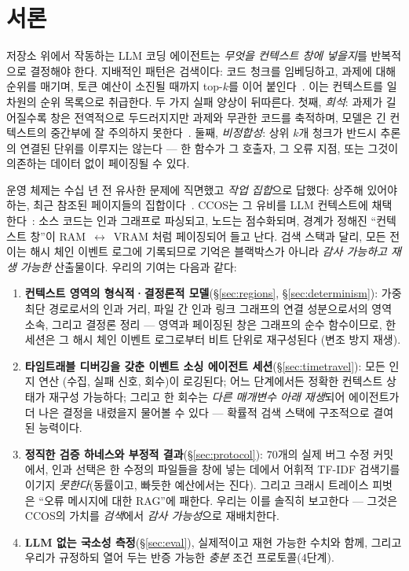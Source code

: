 \documentclass[11pt]{article}
\begin{document}
\section{서론}

저장소 위에서 작동하는 LLM 코딩 에이전트는 \emph{무엇을 컨텍스트 창에 넣을지}를 반복적으로 결정해야 한다.
지배적인 패턴은 검색이다: 코드 청크를 임베딩하고, 과제에 대해 순위를 매기며, 토큰 예산이 소진될 때까지
top-$k$를 이어 붙인다~\cite{lewis2020rag}. 이는 컨텍스트를 일차원의 순위 목록으로 취급한다. 두 가지 실패
양상이 뒤따른다. 첫째, \emph{희석}: 과제가 길어질수록 창은 전역적으로 두드러지지만 과제와 무관한 코드를
축적하며, 모델은 긴 컨텍스트의 중간부에 잘 주의하지 못한다~\cite{liu2023lost}. 둘째, \emph{비정합성}:
상위 $k$개 청크가 반드시 추론의 연결된 단위를 이루지는 않는다 --- 한 함수가 그 호출자, 그 오류 지점, 또는
그것이 의존하는 데이터 없이 페이징될 수 있다.

운영 체제는 수십 년 전 유사한 문제에 직면했고 \emph{작업 집합}으로 답했다: 상주해 있어야 하는, 최근 참조된
페이지들의 집합이다~\cite{denning1968working}. CCOS는 그 유비를 LLM 컨텍스트에 채택한다~\cite{packer2023memgpt}:
소스 코드는 인과 그래프로 파싱되고, 노드는 점수화되며, 경계가 정해진 ``컨텍스트 창''이 RAM~$\leftrightarrow$~VRAM
처럼 페이징되어 들고 난다. 검색 스택과 달리, 모든 전이는 해시 체인 이벤트 로그에 기록되므로 기억은 블랙박스가
아니라 \emph{감사 가능하고 재생 가능한} 산출물이다. 우리의 기여는 다음과 같다:

\begin{enumerate}
  \item \textbf{컨텍스트 영역의 형식적·결정론적 모델}(\S\ref{sec:regions}, \S\ref{sec:determinism}):
  가중 최단 경로로서의 인과 거리, 파일 간 인과 링크 그래프의 연결 성분으로서의 영역 소속, 그리고 결정론 정리 ---
  영역과 페이징된 창은 그래프의 순수 함수이므로, 한 세션은 그 해시 체인 이벤트 로그로부터 비트 단위로 재구성된다
  (변조 방지 재생).
  \item \textbf{타임트래블 디버깅을 갖춘 이벤트 소싱 에이전트 세션}(\S\ref{sec:timetravel}): 모든 인지 연산
  (수집, 실패 신호, 회수)이 로깅된다; 어느 단계에서든 정확한 컨텍스트 상태가 재구성 가능하다; 그리고 한 회수는
  \emph{다른 매개변수 아래 재생}되어 에이전트가 더 나은 결정을 내렸을지 물어볼 수 있다 --- 확률적 검색 스택에
  구조적으로 결여된 능력이다.
  \item \textbf{정직한 검증 하네스와 부정적 결과}(\S\ref{sec:protocol}): $70$개의 실제 버그 수정 커밋에서,
  인과 선택은 한 수정의 파일들을 창에 넣는 데에서 어휘적 TF-IDF 검색기를 이기지 \emph{못한다}(동률이고, 빠듯한
  예산에서는 진다). 그리고 크래시 트레이스 피벗은 ``오류 메시지에 대한 RAG''에 패한다. 우리는 이를 솔직히 보고한다
  --- 그것은 CCOS의 가치를 \emph{검색}에서 \emph{감사 가능성}으로 재배치한다.
  \item \textbf{LLM 없는 국소성 측정}(\S\ref{sec:eval}), 실제적이고 재현 가능한 수치와 함께, 그리고 우리가
  규정하되 열어 두는 반증 가능한 \emph{충분} 조건 프로토콜(4단계).
\end{enumerate}
\end{document}
